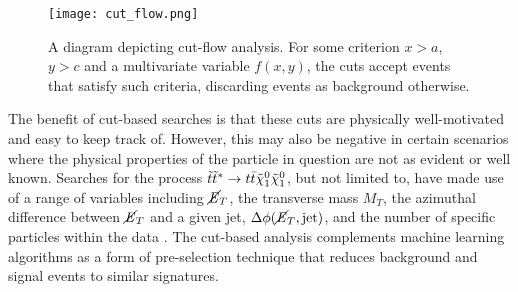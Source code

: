 \begin{figure}[htbp]
    \centering
    \texttt{[image: cut\_flow.png]}
    \caption{A diagram depicting cut-flow analysis. For some criterion $x>a$, $y>c$ and a multivariate variable $f(x,y)$, the cuts accept events that satisfy such criteria, discarding events as background otherwise.}
    \label{fig:cut_flow}
\end{figure}

The benefit of cut-based searches is that these cuts are physically well-motivated and easy to keep track of. However, this may also be negative in certain scenarios where the physical properties of the particle in question are not as evident or well known. Searches for the process $\Tilde{t}\Tilde{t}^*  \rightarrow t\bar{t}\Tilde{\chi}_1^0\Tilde{\chi}_1^0$, but not limited to, have made use of a range of variables including $\cancel{\it{E}}_{T}$, the transverse mass $M_T$, the azimuthal difference between $\cancel{\it{E}}_{T}$ and a given jet, $\Delta \phi (\cancel{\it{E}}_{T}, \text{jet})$, and the number of specific particles within the data \cite{kraml2016scalar, chatrchyan2013search}. The cut-based analysis complements machine learning algorithms as a form of pre-selection technique that reduces background and signal events to similar signatures.